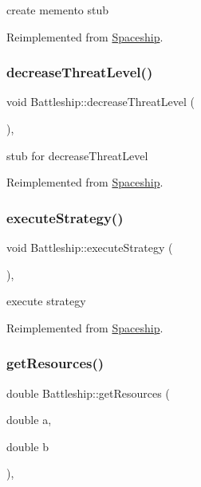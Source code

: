 create memento stub 

Reimplemented from \hyperlink{classSpaceship_a6d272f846b019dec8226ddab65648a7b}{Spaceship}.

\mbox{\label{classBattleship_a31ab6421ece477f4de7989b31aa8ed02}} 
\subsubsection{\texorpdfstring{decrease\+Threat\+Level()}{decreaseThreatLevel()}}
{\footnotesize\ttfamily void Battleship\+::decrease\+Threat\+Level (\begin{DoxyParamCaption}{ }\end{DoxyParamCaption})\hspace{0.3cm}{\ttfamily [inline]}, {\ttfamily [virtual]}}

stub for decrease\+Threat\+Level 

Reimplemented from \hyperlink{classSpaceship_a73a1eefd211e9a2063d924ee85f0c0c7}{Spaceship}.

\mbox{\label{classBattleship_acbb94a57bb20013b07686b750985eb9e}} 
\subsubsection{\texorpdfstring{execute\+Strategy()}{executeStrategy()}}
{\footnotesize\ttfamily void Battleship\+::execute\+Strategy (\begin{DoxyParamCaption}{ }\end{DoxyParamCaption})\hspace{0.3cm}{\ttfamily [inline]}, {\ttfamily [virtual]}}

execute strategy 

Reimplemented from \hyperlink{classSpaceship}{Spaceship}.

\mbox{\label{classBattleship_a91c6d577c5c761b607b204a9fc59c3ad}} 
\subsubsection{\texorpdfstring{get\+Resources()}{getResources()}}
{\footnotesize\ttfamily double Battleship\+::get\+Resources (\begin{DoxyParamCaption}\item[{double}]{a,  }\item[{double}]{b }\end{DoxyParamCaption})\hspace{0.3cm}{\ttfamily [inline]}, {\ttfamily [virtual]}}

